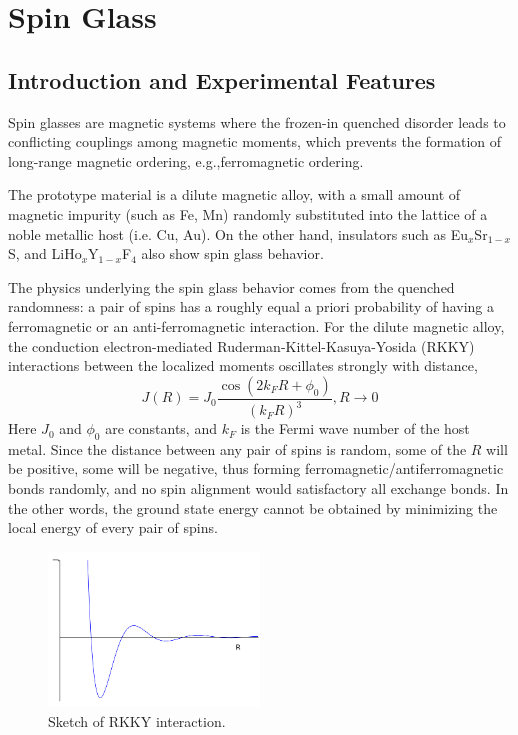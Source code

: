 \chapter{Spin Glass}
\label{chap:SGintro}
\section{Introduction and Experimental Features}
\label{sec:sg_intro}
Spin glasses \cite{Binder-Young-1986} are magnetic systems where the frozen-in quenched  
disorder leads to conflicting couplings among magnetic moments, which prevents the formation 
of long-range magnetic ordering, e.g.,ferromagnetic ordering.

The prototype material is a dilute magnetic alloy, with a small amount of 
magnetic impurity (such as Fe, Mn) randomly substituted into the lattice of a 
noble metallic host (i.e. Cu, Au). On the other hand, insulators such as 
Eu$_x$Sr$_{1-x}$S, and LiHo$_{x}$Y$_{1-x}$F$_{4}$ also show spin glass behavior.
 
The physics underlying the spin glass behavior comes from the quenched 
randomness: a pair of spins has a roughly equal a priori probability of having
a ferromagnetic or an anti-ferromagnetic interaction. For the dilute magnetic 
alloy, the conduction electron-mediated 
Ruderman-Kittel-Kasuya-Yosida (RKKY) interactions between the localized moments
 oscillates strongly with distance, 
 \begin{equation}
   \label{eq:RKKY}
   J(R)=J_0\frac{\cos(2k_FR+\phi_0)}{(k_FR)^3}, R\rightarrow 0
 \end{equation}
Here $J_0$ and $\phi_0$ are constants, and $k_F$ is the Fermi wave number of the
host metal. Since the distance between any pair of spins is random, some of the $R$
will be positive, some will be negative,
thus forming ferromagnetic/antiferromagnetic bonds randomly, and no spin 
alignment would satisfactory all exchange bonds. In the other words, the 
ground state energy cannot be obtained by minimizing the local energy 
of every pair of spins.

\begin{figure}[!h]
  \label{fig:rkky}
  \centering
  \includegraphics[width=0.5\textwidth]{img/RKKY.png}
  \caption{Sketch of RKKY interaction.}
\end{figure}

